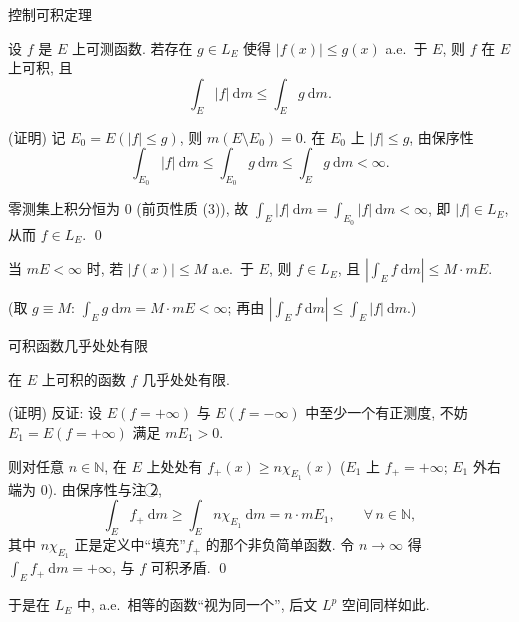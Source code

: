 
\begin{frame}{控制可积定理}

\begin{thm}[控制可积]
设 $f$ 是 $E$ 上可测函数. 若存在 $g \in L_E$ 使得 $|f(x)| \leqslant g(x)$ a.e.\ 于 $E$, 则 $f$ 在 $E$ 上可积, 且
\[
\int_E |f| ~ \mathrm{d} m \leqslant \int_E g ~ \mathrm{d} m .
\]
\end{thm}

\startproof[bg=yellow, fg=red](证明)
记 $E_0 = E(|f| \leqslant g)$, 则 $m(E \setminus E_0) = 0$. 在 $E_0$ 上 $|f| \leqslant g$, 由保序性
\[
\int_{E_0} |f| ~ \mathrm{d} m \leqslant \int_{E_0} g ~ \mathrm{d} m \leqslant \int_E g ~ \mathrm{d} m < \infty .
\]

\pause

零测集上积分恒为 $0$ (前页性质 (3)), 故
$\int_E |f| ~ \mathrm{d} m = \int_{E_0} |f| ~ \mathrm{d} m < \infty$, 即 $|f| \in L_E$,
从而 $f \in L_E$. \qed

\pause

\begin{cor}
当 $mE < \infty$ 时, 若 $|f(x)| \leqslant M$ a.e.\ 于 $E$, 则 $f \in L_E$, 且
$|\int_E f ~ \mathrm{d} m| \leqslant M \cdot mE$.
\end{cor}
(取 $g \equiv M$: $\int_E g ~ \mathrm{d} m = M \cdot mE < \infty$; 再由
$|\int_E f ~ \mathrm{d} m| \leqslant \int_E |f| ~ \mathrm{d} m$.)

\end{frame}


\begin{frame}{可积函数几乎处处有限}

\begin{thm}
在 $E$ 上可积的函数 $f$ 几乎处处有限.
\end{thm}

\startproof[bg=yellow, fg=red](证明)
反证: 设 $E(f = +\infty)$ 与 $E(f = -\infty)$ 中至少一个有正测度,
不妨 $E_1 = E(f = +\infty)$ 满足 $m E_1 > 0$.

\pause

则对任意 $n \in \mathbb{N}$, 在 $E$ 上处处有 $f_+(x) \geqslant n \chi_{E_1}(x)$
($E_1$ 上 $f_+ = +\infty$; $E_1$ 外右端为 $0$). 由保序性与注 \textcircled{2},
\[
\int_E f_+ ~ \mathrm{d} m \geqslant \int_E n \chi_{E_1} ~ \mathrm{d} m = n \cdot m E_1,
\qquad \forall\, n \in \mathbb{N},
\]
其中 $n \chi_{E_1}$ 正是定义中``填充''$f_+$ 的那个非负简单函数.
令 $n \to \infty$ 得 $\int_E f_+ ~ \mathrm{d} m = +\infty$, 与 $f$ 可积矛盾. \qed

\pause

\begin{attnblock}
于是在 $L_E$ 中, a.e.\ 相等的函数``视为同一个'', 后文 $L^p$ 空间同样如此.
\end{attnblock}

\end{frame}

